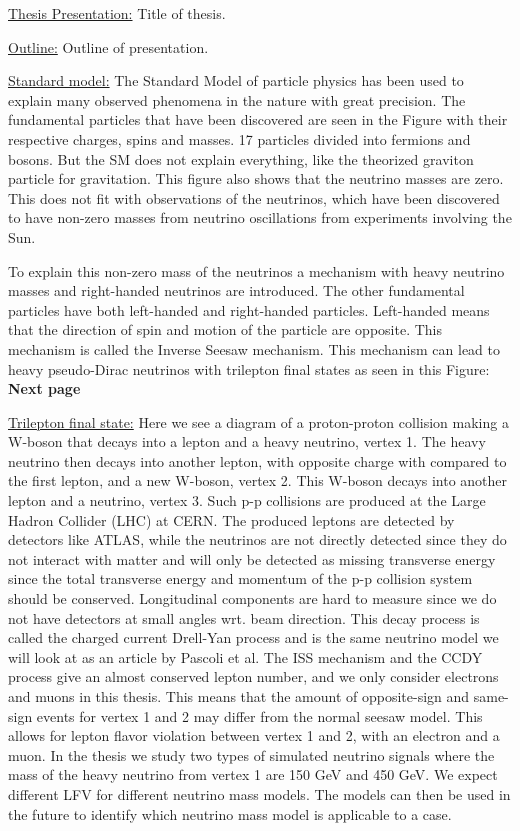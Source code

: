 \documentclass[a4paper, american, 12pt]{report}
\begin{document}
	\underline{Thesis Presentation:}
	Title of thesis.
	
	
	\underline{Outline:}
	Outline of presentation.
	
	
	\underline{Standard model:}
	The Standard Model of particle physics has been used to explain many observed phenomena in the nature with great precision. The fundamental particles that have been discovered are seen in the Figure with their respective charges, spins and masses. 17 particles divided into fermions and bosons. But the SM does not explain everything, like the theorized graviton particle for gravitation. This figure also shows that the neutrino masses are zero. This does not fit with observations of the neutrinos, which have been discovered to have non-zero masses from neutrino oscillations from experiments involving the Sun.
	
	To explain this non-zero mass of the neutrinos a mechanism with heavy neutrino masses and right-handed neutrinos are introduced. The other fundamental particles have both left-handed and right-handed particles. Left-handed means that the direction of spin and motion of the particle are opposite. This mechanism is called the Inverse Seesaw mechanism. This mechanism can lead to heavy pseudo-Dirac neutrinos with trilepton final states as seen in this Figure: \textbf{Next page}
	
	
	\underline{Trilepton final state:}
	Here we see a diagram of a proton-proton collision making a W-boson that decays into a lepton and a heavy neutrino, vertex 1. The heavy neutrino then decays into another lepton, with opposite charge with compared to the first lepton, and a new W-boson, vertex 2. This W-boson decays into another lepton and a neutrino, vertex 3. Such p-p collisions are produced at the Large Hadron Collider (LHC) at CERN. The produced leptons are detected by detectors like ATLAS, while the neutrinos are not directly detected since they do not interact with matter and will only be detected as missing transverse energy since the total transverse energy and momentum of the p-p collision system should be conserved. Longitudinal components are hard to measure since we do not have detectors at small angles wrt. beam direction. This decay process is called the charged current Drell-Yan process and is the same neutrino model we will look at as an article by Pascoli et al. The ISS mechanism and the CCDY process give an almost conserved lepton number, and we only consider electrons and muons in this thesis. This means that the amount of opposite-sign and same-sign events for vertex 1 and 2 may differ from the normal seesaw model. This allows for lepton flavor violation between vertex 1 and 2, with an electron and a muon. In the thesis we study two types of simulated neutrino signals where the mass of the heavy neutrino from vertex 1 are 150 GeV and 450 GeV. We expect different LFV for different neutrino mass models. The models can then be used in the future to identify which neutrino mass model is applicable to a case.
	
\end{document}
